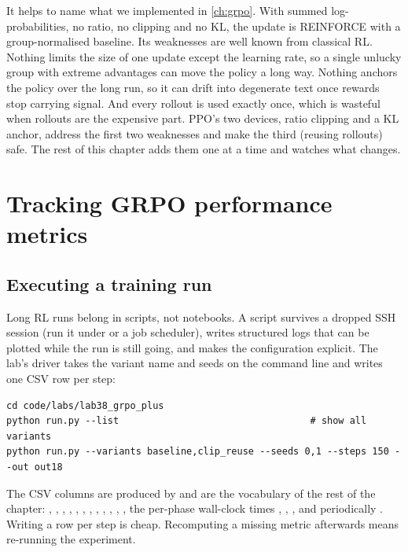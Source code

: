 It helps to name what we implemented in \cref{ch:grpo}. With summed log-probabilities, no
ratio, no clipping and no KL, the update is REINFORCE with a group-normalised baseline. Its
weaknesses are well known from classical RL. Nothing limits the size of one update except
the learning rate, so a single unlucky group with extreme advantages can move the policy a
long way. Nothing anchors the policy over the long run, so it can drift into degenerate text
once rewards stop carrying signal. And every rollout is used exactly once, which is wasteful
when rollouts are the expensive part. PPO's two devices, ratio clipping and a KL anchor,
address the first two weaknesses and make the third (reusing rollouts) safe. The rest of this
chapter adds them one at a time and watches what changes.

\section{Tracking GRPO performance metrics}\label{sec:grpo2:metrics}

\subsection{Executing a training run}\label{sec:grpo2:exec}

Long RL runs belong in scripts, not notebooks. A script survives a dropped SSH session
(run it under  or a job scheduler), writes structured logs that can be plotted
while the run is still going, and makes the configuration explicit. The lab's driver takes
the variant name and seeds on the command line and writes one CSV row per step:

\begin{lstlisting}[style=shell,caption={Running GRPO variants from the terminal.},label={lst:grpo2:run}]
cd code/labs/lab38_grpo_plus
python run.py --list                                  # show all variants
python run.py --variants baseline,clip_reuse --seeds 0,1 --steps 150 --out out18
\end{lstlisting}

The CSV columns are produced by  and are the vocabulary of the rest
of the chapter: , , , ,
, , , ,
, , , , the per-phase
wall-clock times , , , and periodically
. Writing a row per step is cheap. Recomputing a missing metric afterwards
means re-running the experiment.

